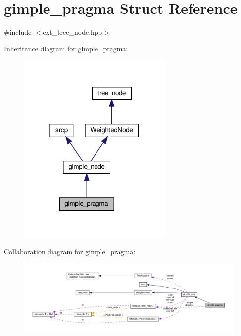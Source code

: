 \hypertarget{structgimple__pragma}{}\section{gimple\+\_\+pragma Struct Reference}
\label{structgimple__pragma}


{\ttfamily \#include $<$ext\+\_\+tree\+\_\+node.\+hpp$>$}



Inheritance diagram for gimple\+\_\+pragma\+:
\nopagebreak
\begin{figure}[H]
\begin{center}
\leavevmode
\includegraphics[width=214pt]{d2/d82/structgimple__pragma__inherit__graph}
\end{center}
\end{figure}


Collaboration diagram for gimple\+\_\+pragma\+:
\nopagebreak
\begin{figure}[H]
\begin{center}
\leavevmode
\includegraphics[width=350pt]{d3/d0a/structgimple__pragma__coll__graph}
\end{center}
\end{figure}
